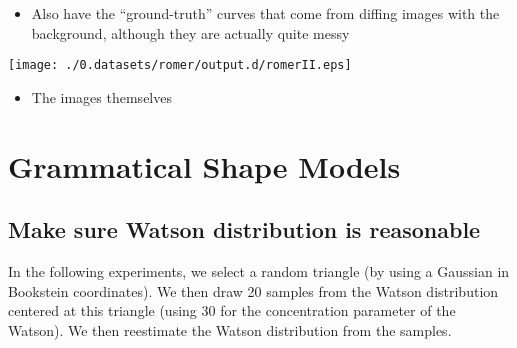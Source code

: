 \documentclass{book}
\begin{document}
\begin{itemize}
\item Also have the ``ground-truth'' curves that come from diffing images
    with the background, although they are actually quite messy
\end{itemize}
\texttt{[image: ./0.datasets/romer/output.d/romerII.eps]}
\begin{itemize}
\item The images themselves
\end{itemize}
\section{Grammatical Shape Models}
\label{sec-2_2}
\subsection{Make sure Watson distribution is reasonable}
\label{sec-2_2_1}


In the following experiments, we select a random triangle (by using a
Gaussian in Bookstein coordinates). We then draw 20 samples from the
Watson distribution centered at this triangle (using 30 for the
concentration parameter of the Watson). We then reestimate the Watson
distribution from the samples.
\end{document}
